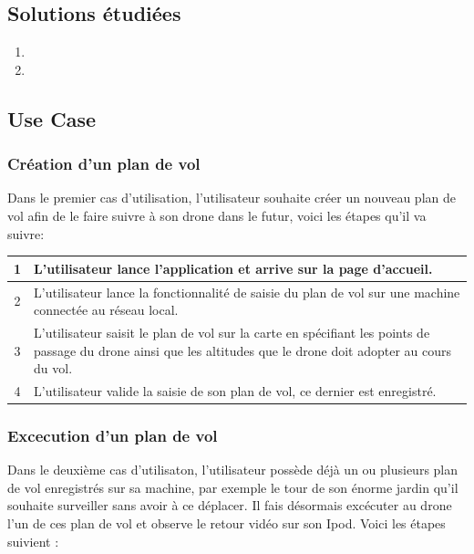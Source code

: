 \documentclass{article}
\begin{document}
        

	\subsection{Solutions étudiées}
		\begin{enumerate}
        	\item 
        	\item 
		\end{enumerate}
		
	\newpage
	\subsection{Use Case}	
	    \subsubsection{Création d'un plan de vol}
	    Dans le premier cas d'utilisation, l'utilisateur souhaite créer un nouveau plan de vol afin de le faire suivre à son drone dans le futur, voici les étapes qu'il va suivre:
	    
	    \vspace{0.7cm}	     
	    \begin{center}
	    \renewcommand{\arraystretch}{2}
        \begin{tabularx}{15cm}{|c|X|}
            \hline
            1 & L'utilisateur lance l'application et arrive sur la page d'accueil.\\
            \hline
            2 & L'utilisateur lance la fonctionnalité de saisie du plan de vol sur une machine connectée au réseau local.\\
            \hline
            3 & L'utilisateur saisit le plan de vol sur la carte en spécifiant les points de passage du drone ainsi que les altitudes que le drone doit adopter au cours du vol. \\
            \hline
            4 & L'utilisateur valide la saisie de son plan de vol, ce dernier est enregistré. \\
            \hline
        \end{tabularx}
        \end{center}
        
	    \vspace{0.8cm}
	    
	    \subsubsection{Excecution d'un plan de vol}
	    Dans le deuxième cas d'utilisaton, l'utilisateur possède déjà un ou plusieurs plan de vol enregistrés sur sa machine, par exemple le tour de son énorme jardin qu'il souhaite surveiller sans avoir à ce déplacer. Il fais désormais excécuter au drone l'un de ces plan de vol et observe le retour vidéo sur son Ipod.
	    Voici les étapes suivient :
	    
\end{document}
